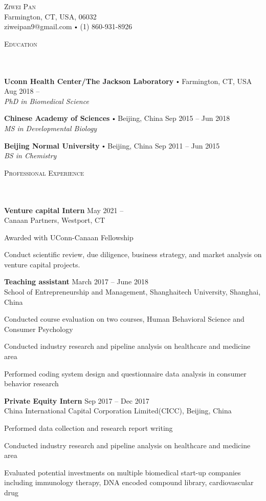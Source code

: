 \documentclass{article}
\newcommand{\contact}[3]{
\vspace*{5pt}
\begin{center}
{\LARGE \scshape {#1}}\\
\vspace{3pt}
#2 
\vspace{2pt}
#3
\end{center}
\vspace*{-8pt}
}
\newcommand{\header}[1]{{
\hspace*{-15pt}\vspace*{6pt} \textsc{#1}} \vspace*{-6pt} 
\lineunder
}
\newcommand{\lineunder}{
\vspace*{-8pt} \\ \hspace*{-18pt} 
\hrulefill \\
}
\newcommand{\school}[4]{
\textbf{#1} \labelitemi #2 \hfill #3 \\ #4 \vspace*{5pt}
}
\newcommand{\employer}[4]{{
\vspace*{2pt}%
\textbf{#1} #2 \hfill #3\\ #4 \vspace*{2pt}}
}
\renewcommand{\labelitemi}{
$\vcenter{\hbox{\tiny$\bullet$}}$\hspace*{3pt}
}
\renewcommand{\labelitemii}{
$\vcenter{\hbox{\tiny$\bullet$}}$\hspace*{-3pt}
}
\newenvironment{bullet-list-minor}{
\begin{list}{\labelitemii}{\setlength\leftmargin{15pt} 
\topsep 0pt \itemsep -2pt}}{\vspace*{4pt}\end{list}
}
\begin{document}
\small
\smallskip
\vspace*{-44pt}

\contact{Ziwei Pan}
{Farmington, CT, USA, 06032\\}
{ziweipan9@gmail.com \labelitemi (1) 860-931-8926}
\vspace{15pt}
\header{Education}
    \school{Uconn Health Center/The Jackson Laboratory}{Farmington, CT, USA}{Aug 2018 -- }
    {\textit{PhD in Biomedical Science}}

    \school{Chinese Academy of Sciences}{Beijing, China}{Sep 2015 -- Jun 2018}
    {\textit{MS in Developmental Biology}}
    
    \school{Beijing Normal University}{Beijing, China}{Sep 2011 -- Jun 2015}
    {\textit{BS in Chemistry}}
    
\vspace*{4pt}%
\header{Professional Experience}
    \employer{Venture capital Intern}{}{May 2021 --  }{Canaan Partners, Westport, CT}
	\begin{bullet-list-minor}
	\item Awarded with UConn-Canaan Fellowship
	\item Conduct scientific review, due diligence, business strategy, and market analysis on venture capital projects.
    \end{bullet-list-minor}
    
    \employer{Teaching assistant}{}{March 2017 -- June 2018}{School of Entrepreneurship and Management, Shanghaitech University, Shanghai, China}
	\begin{bullet-list-minor}
	\item Conducted course evaluation on two courses, Human Behavioral Science and Consumer Psychology
	\item Conducted industry research and pipeline analysis on healthcare and medicine area
	\item Performed coding system design and questionnaire data analysis in consumer behavior research 
    \end{bullet-list-minor}
    
    \employer{Private Equity Intern}{}{Sep 2017 -- Dec 2017}{China International Capital Corporation Limited(CICC), Beijing, China}
	\begin{bullet-list-minor}
	\item Performed data collection and research report writing
	\item Conducted industry research and pipeline analysis on healthcare and medicine area
	\item Evaluated potential investments on multiple biomedical start-up companies including immunology therapy, DNA encoded compound library, cardiovascular drug
    \end{bullet-list-minor}
    
\end{document}
